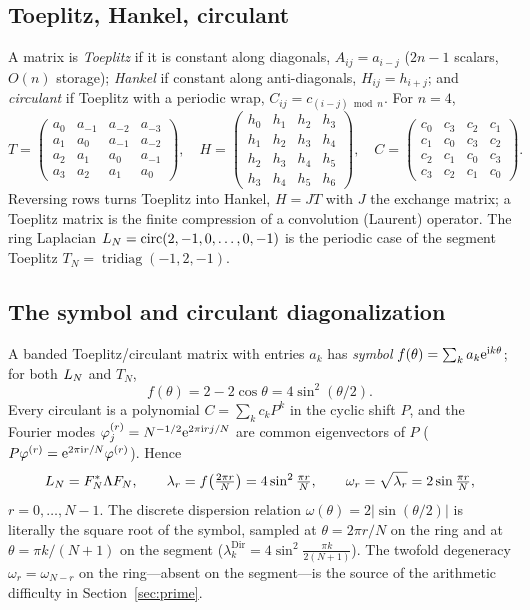 \subsection{Toeplitz, Hankel, circulant}
A matrix is \emph{Toeplitz} if it is constant along diagonals, $A_{ij}=a_{i-j}$ ($2n-1$ scalars,
$O(n)$ storage); \emph{Hankel} if constant along anti-diagonals, $H_{ij}=h_{i+j}$; and
\emph{circulant} if Toeplitz with a periodic wrap, $C_{ij}=c_{(i-j)\bmod n}$. For $n=4$,
\[
T=\begin{pmatrix}a_0&a_{-1}&a_{-2}&a_{-3}\\ a_1&a_0&a_{-1}&a_{-2}\\
a_2&a_1&a_0&a_{-1}\\ a_3&a_2&a_1&a_0\end{pmatrix},\quad
H=\begin{pmatrix}h_0&h_1&h_2&h_3\\ h_1&h_2&h_3&h_4\\ h_2&h_3&h_4&h_5\\ h_3&h_4&h_5&h_6\end{pmatrix},\quad
C=\begin{pmatrix}c_0&c_3&c_2&c_1\\ c_1&c_0&c_3&c_2\\ c_2&c_1&c_0&c_3\\ c_3&c_2&c_1&c_0\end{pmatrix}.
\]
Reversing rows turns Toeplitz into Hankel, $H=JT$ with $J$ the exchange matrix; a Toeplitz matrix is
the finite compression of a convolution (Laurent) operator. The ring Laplacian
$L_N=\operatorname{circ}(2,-1,0,\dots,0,-1)$ is the periodic case of the segment Toeplitz
$T_N=\operatorname{tridiag}(-1,2,-1)$.

\subsection{The symbol and circulant diagonalization}
A banded Toeplitz/circulant matrix with entries $a_k$ has \emph{symbol}
$f(\theta)=\sum_k a_k\mathrm{e}^{\mathrm{i}k\theta}$; for both $L_N$ and $T_N$,
\[ f(\theta)=2-2\cos\theta=4\sin^2(\theta/2). \]
Every circulant is a polynomial $C=\sum_k c_k P^k$ in the cyclic shift $P$, and the Fourier modes
$\varphi^{(r)}_j=N^{-1/2}\mathrm{e}^{2\pi\mathrm{i}rj/N}$ are common eigenvectors of $P$
($P\varphi^{(r)}=\mathrm{e}^{2\pi\mathrm{i}r/N}\varphi^{(r)}$). Hence
\begin{equation}\label{eq:diag}
  L_N=F_N^\ast\Lambda F_N,\qquad
  \lambda_r=f\!\left(\tfrac{2\pi r}{N}\right)=4\sin^2\tfrac{\pi r}{N},\qquad
  \omega_r=\sqrt{\lambda_r}=2\sin\tfrac{\pi r}{N},
\end{equation}
$r=0,\dots,N-1$. The discrete dispersion relation $\omega(\theta)=2|\sin(\theta/2)|$ is literally the
square root of the symbol, sampled at $\theta=2\pi r/N$ on the ring and at $\theta=\pi k/(N{+}1)$ on
the segment ($\lambda^{\mathrm{Dir}}_k=4\sin^2\frac{\pi k}{2(N+1)}$). The twofold degeneracy
$\omega_r=\omega_{N-r}$ on the ring---absent on the segment---is the source of the arithmetic
difficulty in Section~\ref{sec:prime}.

